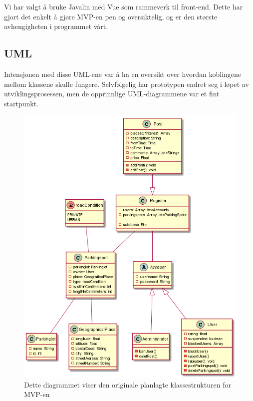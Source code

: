 \documentclass[12pt]{article}
\begin{document}
    Vi har valgt å bruke Javalin med Vue som rammeverk til front-end. Dette har gjort det enkelt å gjøre MVP-en pen og oversiktelig, og er den største avhengigheten i programmet vårt.


    \subsection{UML}
    Intensjonen med disse UML-ene var å ha en oversikt over hvordan koblingene mellom klassene skulle fungere. Selvfølgelig har prototypen endret seg i løpet av utviklingsprosessen, men de opprinnlige UML-diagrammene var et fint startpunkt.

    \begin{figure}[H]
        \centering
        \includegraphics[scale=0.3]{bilder/prototypen/klassediagram_v1.png}
        \caption{Dette diagrammet viser den originale planlagte klassestrukturen for MVP-en}
    \end{figure}
    
\end{document}
